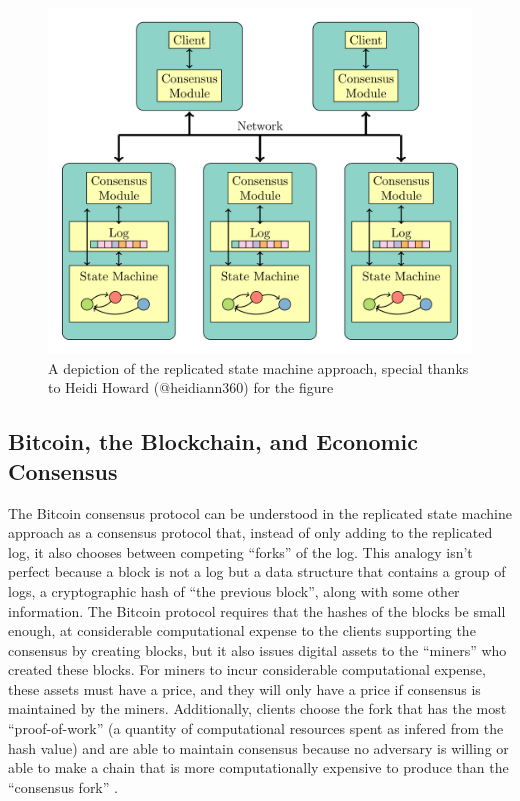 \documentclass[11pt,a4paper]{article}
\theoremstyle{plain}
\theoremstyle{definition}
\begin{document}
\begin{figure}
\includegraphics{smr.png}
\caption{A depiction of the replicated state machine approach, special thanks to Heidi Howard (@heidiann360) for the figure}
\end{figure}


\subsection{Bitcoin, the Blockchain, and Economic Consensus}

The Bitcoin consensus protocol can be understood in the replicated state machine approach as a consensus protocol that, instead of only adding to the replicated log, it also chooses between competing ``forks'' of the log. 
This analogy isn't perfect because a block is not a log but a data structure that contains a group of logs, a cryptographic hash of ``the previous block'', along with some other information. The Bitcoin protocol requires that the hashes of the blocks be small enough, at considerable computational expense to the clients supporting the consensus by creating blocks, but it also issues digital assets to the ``miners'' who created these blocks. For miners to incur considerable computational expense, these assets must have a price, and they will only have a price if consensus is maintained by the miners. Additionally, clients choose the fork that has the most ``proof-of-work'' (a quantity of computational resources spent as infered from the hash value) and are able to maintain consensus because no adversary is willing or able to make a chain that is more computationally expensive to produce than the ``consensus fork'' \cite{Bitcoin}.
\end{document}
